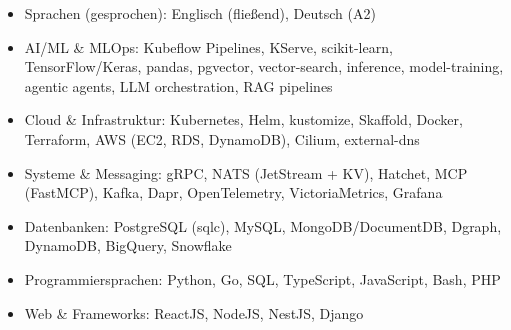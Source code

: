 \documentclass[10pt,a4paper]{resume}
\begin{document}
\begin{itemize}[leftmargin=1.4em,nosep,topsep=2pt]
  \item Sprachen (gesprochen): Englisch (fließend), Deutsch (A2)
  \item AI/ML \& MLOps: Kubeflow Pipelines, KServe, scikit-learn, TensorFlow/Keras, pandas, pgvector, vector-search, inference, model-training, agentic agents, LLM orchestration, RAG pipelines
  \item Cloud \& Infrastruktur: Kubernetes, Helm, kustomize, Skaffold, Docker, Terraform, AWS (EC2, RDS, DynamoDB), Cilium, external-dns
  \item Systeme \& Messaging: gRPC, NATS (JetStream + KV), Hatchet, MCP (FastMCP), Kafka, Dapr, OpenTelemetry, VictoriaMetrics, Grafana
  \item Datenbanken: PostgreSQL (sqlc), MySQL, MongoDB/DocumentDB, Dgraph, DynamoDB, BigQuery, Snowflake
  \item Programmiersprachen: Python, Go, SQL, TypeScript, JavaScript, Bash, PHP
  \item Web \& Frameworks: ReactJS, NodeJS, NestJS, Django
\end{itemize}
\end{document}
